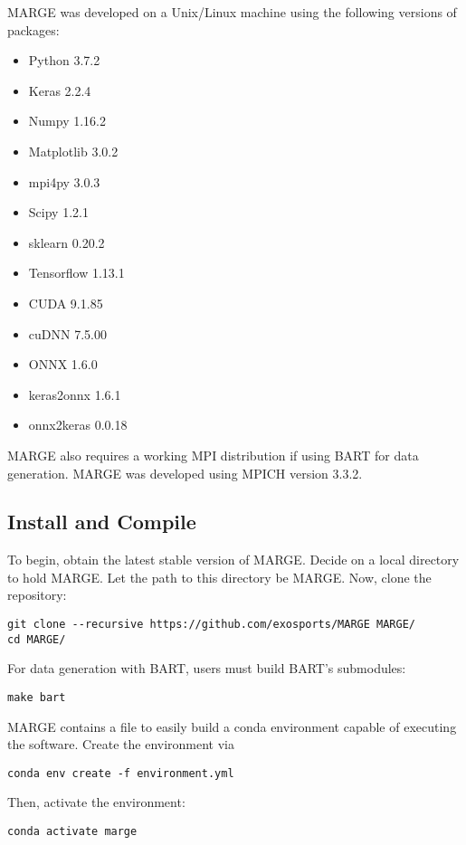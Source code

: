 \documentclass[letterpaper, 12pt]{article}
\begin{document}
\noindent MARGE was developed on a Unix/Linux machine using the following 
versions of packages:

\begin{itemize}
\item Python 3.7.2
\item Keras 2.2.4
\item Numpy 1.16.2
\item Matplotlib 3.0.2
\item mpi4py 3.0.3
\item Scipy 1.2.1
\item sklearn 0.20.2
\item Tensorflow 1.13.1
\item CUDA 9.1.85
\item cuDNN 7.5.00
\item ONNX 1.6.0
\item keras2onnx 1.6.1
\item onnx2keras 0.0.18
\end{itemize}

\noindent MARGE also requires a working MPI distribution if using BART for 
data generation.  MARGE was developed using MPICH version 3.3.2.



\subsection{Install and Compile}
\label{sec:install}

\noindent To begin, obtain the latest stable version of MARGE.  Decide on a 
local directory to hold MARGE.  Let the path to this directory be 
MARGE. Now, clone the repository:
\begin{verbatim}
git clone --recursive https://github.com/exosports/MARGE MARGE/
cd MARGE/
\end{verbatim}

\noindent For data generation with BART, users must build BART's submodules:
\begin{verbatim}
make bart
\end{verbatim}

\noindent MARGE contains a file to easily build a conda environment capable of 
executing the software.  Create the environment via
\begin{verbatim}
conda env create -f environment.yml
\end{verbatim}

\noindent Then, activate the environment:
\begin{verbatim}
conda activate marge
\end{verbatim}
\end{document}
